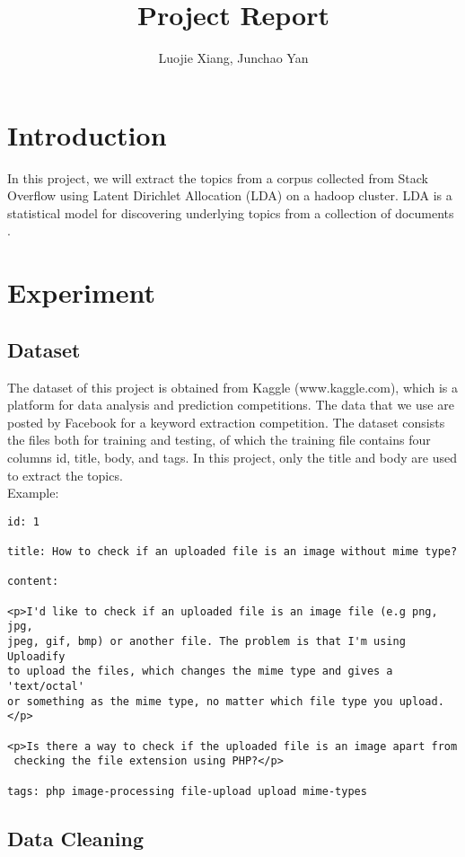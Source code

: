 \documentclass{article}
\begin{document}
\title{Project Report}
\author{Luojie Xiang, Junchao Yan}
\date{}
\maketitle

\section{Introduction}
In this project, we will extract the topics from a corpus collected from Stack Overflow using Latent Dirichlet Allocation (LDA) on a hadoop cluster. LDA is a statistical model for discovering underlying topics from a collection of documents \cite{blei2003latent}. 

\section{Experiment}
\subsection{Dataset}
The dataset of this project is obtained from Kaggle (www.kaggle.com), which is a platform for data analysis and prediction competitions. The data that we use are posted by Facebook for a keyword extraction competition. The dataset consists the files both for training and testing, of which the training file contains four columns id, title, body, and tags. In this project, only the title and body are used to extract the topics.\\[10pt]
Example:
\begin{verbatim}
id: 1

title: How to check if an uploaded file is an image without mime type?

content:

<p>I'd like to check if an uploaded file is an image file (e.g png, jpg, 
jpeg, gif, bmp) or another file. The problem is that I'm using Uploadify 
to upload the files, which changes the mime type and gives a 'text/octal' 
or something as the mime type, no matter which file type you upload.</p>

<p>Is there a way to check if the uploaded file is an image apart from
 checking the file extension using PHP?</p>

tags: php image-processing file-upload upload mime-types
\end{verbatim}

\subsection{Data Cleaning}
\end{document}

